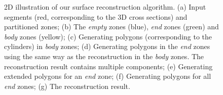 \begin{figure} [htbp]
{\begin{minipage}[b]{0.23\textwidth}
    \end{minipage}}
  \caption{2D illustration of our surface reconstruction algorithm.
  (a) Input segments (red, corresponding to the 3D cross sections) and partitioned zones;
  (b) The \textit{empty} zones (blue), \textit{end} zones (green) and \textit{body} zones (yellow);
  (c) Generating polygons (corresponding to the cylinders) in \textit{body} zones;
  (d) Generating polygons in the \textit{end} zones using the same way as the reconstruction in the \textit{body} zones. The reconstruction result contains multiple components;
  (e) Generating extended polygons for an \textit{end} zone;
  (f) Generating polygons for all \textit{end} zones;
  (g) The reconstruction result. }
  \label{fig:workflow2dortho}
\end{figure}


